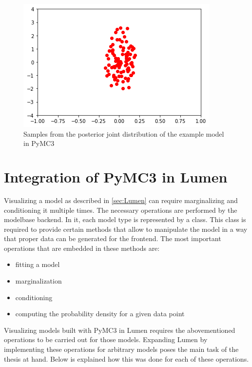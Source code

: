 \documentclass{article}
\begin{document}
\begin{figure}
	\includegraphics[width=\textwidth]{images/PyMC3_joint_posterior_samples_simple_model.png}
	\caption[Samples from the posterior joint distribution of the example model in PyMC3]{Samples from the posterior joint distribution of the example model in PyMC3}
	\label{fig:PyMC3_joint_posterior_samples_simple_model}
\end{figure}

\section{Integration of PyMC3 in Lumen}
\label{sec:lumen_pymc3_integration}
Visualizing a model as described in \autoref{sec:Lumen} can require marginalizing and conditioning it multiple times. The necessary operations are performed by the modelbase backend. In it, each model type is represented by a class. This class is required to provide certain methods that allow to manipulate the model in a way that proper data can be generated for the frontend. The most important operations that are embedded in these methods are:
\begin{itemize}
	\item fitting a model
	\item marginalization
	\item conditioning
	\item computing the probability density for a given data point
\end{itemize}
Visualizing models built with PyMC3 in Lumen requires the abovementioned operations to be carried out for those models. Expanding Lumen by implementing these operations for arbitrary models poses the main task of the thesis at hand. Below is explained how this was done for each of these operations.
\end{document}
